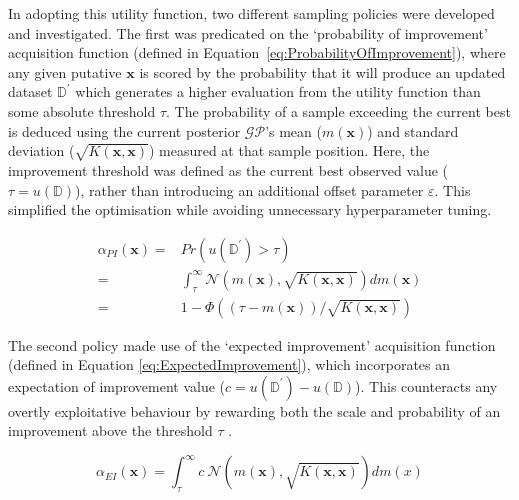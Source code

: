 In adopting this utility function, two different sampling policies were
 developed and investigated.
The first was predicated on the `probability of improvement' acquisition 
 function (defined in Equation~\ref{eq:ProbabilityOfImprovement}), where any 
 given putative \(\mathbf{x}\) is scored by the probability that it will 
 produce an updated dataset \(\mathbb{D}^{\prime}\) which generates a higher
 evaluation from the utility function than some absolute threshold \(\tau\).
The probability of a sample exceeding the current best is deduced using the
 current posterior \(\mathcal{GP}\)'s mean (\(m(\textbf{x})\)) and standard
 deviation (\(\sqrt{K(\mathbf{x},\mathbf{x})}\)) measured at that sample
 position.
Here, the improvement threshold was defined as the current best observed
 value (\(\tau=u(\mathbb{D})\)), rather than introducing an additional
 offset parameter \(\varepsilon\).
This simplified the optimisation while avoiding unnecessary hyperparameter
 tuning.

\footnotesize
\begin{equation}\label{eq:ProbabilityOfImprovement}
    \begin{split}
        \alpha_{PI}(\mathbf{x})=&Pr(u(\mathbb{D}^{\prime})>\tau)\\
        =&\int_{\tau}^{\infty}\mathcal{N}(m(\mathbf{x}),\sqrt{K(\mathbf{x},\mathbf{x})})dm(\mathbf{x})\\
        =&1-\Phi((\tau-m(\mathbf{x}))/\sqrt{K(\mathbf{x},\mathbf{x})})
    \end{split}
\end{equation}
\normalsize

The second policy made use of the `expected improvement' acquisition
 function (defined in Equation \ref{eq:ExpectedImprovement}), which
 incorporates an expectation of improvement value
 (\(c=u(\mathbb{D}^{\prime})-u(\mathbb{D})\)).
This counteracts any overtly exploitative behaviour by rewarding both the scale and 
 probability of an improvement above the threshold \(\tau\) \autocite{Teh2020}.

\footnotesize
\begin{equation}\label{eq:ExpectedImprovement}
    \alpha_{EI}(\mathbf{x})=\int_{\tau}^{\infty}c\ \mathcal{N}(m(\mathbf{x}),\sqrt{K(\mathbf{x},\mathbf{x})})dm(x)
\end{equation}
\normalsize


